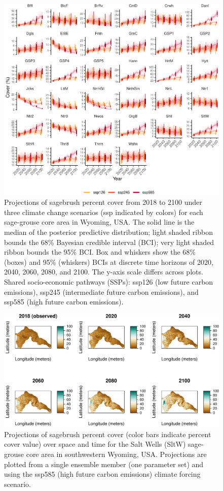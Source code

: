 \documentclass[
  12pt,
]{article}
\begin{document}
\begin{figure}
\centering
\includegraphics{sageCastManuscript_files/figure-latex/projections-1.pdf}
\caption{\label{fig:projections}Projections of sagebrush percent cover from 2018 to 2100 under three climate change scenarios (ssp indicated by colors) for each sage-grouse core area in Wyoming, USA. The solid line is the median of the posterior predictive distribution; light shaded ribbon bounds the 68\% Bayesian credible interval (BCI); very light shaded ribbon bounds the 95\% BCI. Box and whiskers show the 68\% (boxes) and 95\% (whiskers) BCIs at discrete time horizons of 2020, 2040, 2060, 2080, and 2100. The y-axis scale differs across plots. Shared socio-economic pathways (SSPs): ssp126 (low future carbon emissions), ssp245 (intermediate future carbon emissions), and ssp585 (high future carbon emissions).}
\end{figure}

\begin{figure}
\centering
\includegraphics{sageCastManuscript_files/figure-latex/spatial-projections-1.pdf}
\caption{\label{fig:spatial-projections}Projections of sagebrush percent cover (color bars indicate percent cover value) over space and time for the Salt Wells (SltW) sage-grouse core area in southwestern Wyoming, USA. Projections are plotted from a single ensemble member (one parameter set) and using the ssp585 (high future carbon emissions) climate forcing scenario.}
\end{figure}
\end{document}
